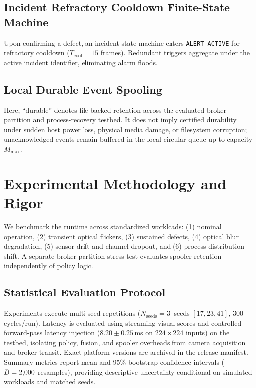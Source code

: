\documentclass[conference]{IEEEtran}
\begin{document}
\subsection{Incident Refractory Cooldown Finite-State Machine}
Upon confirming a defect, an incident state machine enters \texttt{ALERT\_ACTIVE} for refractory cooldown ($T_{\mathrm{cool}} = 15$ frames). Redundant triggers aggregate under the active incident identifier, eliminating alarm floods.

\subsection{Local Durable Event Spooling}
Here, ``durable'' denotes file-backed retention across the evaluated broker-partition and process-recovery testbed. It does not imply certified durability under sudden host power loss, physical media damage, or filesystem corruption; unacknowledged events remain buffered in the local circular queue up to capacity $M_{\mathrm{max}}$.

\section{Experimental Methodology and Rigor}
We benchmark the runtime across \TotalWorkloadScenarios{} standardized workloads: (1) nominal operation, (2) transient optical flickers, (3) sustained defects, (4) optical blur degradation, (5) sensor drift and channel dropout, and (6) process distribution shift. A separate broker-partition stress test evaluates spooler retention independently of policy logic.

\subsection{Statistical Evaluation Protocol}
Experiments execute multi-seed repetitions ($N_{\mathrm{seeds}} = 3$, seeds $[17, 23, 41]$, 300 cycles/run). Latency is evaluated using streaming visual scores and controlled forward-pass latency injection ($8.20 \pm 0.25$\,ms on $224 \times 224$ inputs) on the testbed, isolating policy, fusion, and spooler overheads from camera acquisition and broker transit. Exact platform versions are archived in the release manifest. Summary metrics report mean and 95\% bootstrap confidence intervals ($B = 2{,}000{}$ resamples), providing descriptive uncertainty conditional on simulated workloads and matched seeds.
\end{document}
